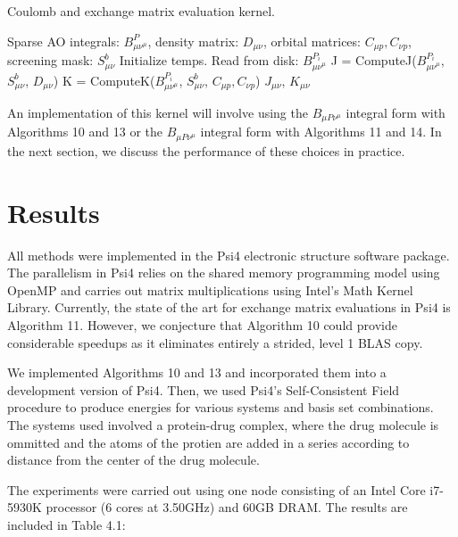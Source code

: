 \begin{algorithm}[H]
\caption{Coulomb and exchange matrix evaluation kernel.}
\begin{algorithmic}
\REQUIRE Sparse AO integrals: $B^P_{\mu \nu^{\mu}}$, density matrix: $D_{\mu \nu}$, orbital matrices: $C_{\mu p}, C_{\nu p}$, screening mask: $S_{\mu \nu}^b$
\STATE Initialize temps.
    \STATE Read from disk: $B^{P_i}_{\mu \nu^{\mu}}$
    \STATE J = ComputeJ($B^{P_i}_{\mu \nu^{\mu}}$, $S_{\mu \nu}^b$, $D_{\mu \nu}$)
    \STATE K = ComputeK($B^{P_i}_{\mu \nu^{\mu}}$, $S_{\mu \nu}^b$, $C_{\mu p}, C_{\nu p}$)
\ENDFOR
\RETURN $J_{\mu \nu}$, $K_{\mu \nu}$
\end{algorithmic}
\end{algorithm}

\noindent An implementation of this kernel will involve using the $B_{\mu P \nu^\mu}$ integral form with Algorithms 10 and 13 or the 
$B_{\mu P \nu^\mu}$ integral form with Algorithms 11 and 14. In the next section, we discuss the performance of these choices in practice.

\section{Results}

All methods were implemented in the {\sc Psi4} electronic structure software package.
The parallelism in {\sc Psi4} relies on the shared memory programming model using OpenMP 
and carries out matrix multiplications using Intel's Math Kernel
Library. Currently, the state of the art for exchange matrix evaluations in
{\sc Psi4} is Algorithm 11. However, we conjecture that Algorithm 10 could provide 
considerable speedups as it eliminates entirely a strided, level 1 BLAS copy. 

We implemented Algorithms 10 and 13 and incorporated them into a development version of {\sc Psi4}. 
Then, we used {\sc Psi4}'s Self-Consistent Field
procedure to produce energies for various systems and basis set combinations. The systems used involved a protein-drug complex,
where the drug molecule is ommitted and the atoms of the protien are added in a series according to distance from the center of
the drug molecule. 

The experiments were carried out using one node consisting of an Intel Core i7-5930K processor
(6 cores at 3.50GHz) and 60GB DRAM. The results are included in Table 4.1:

